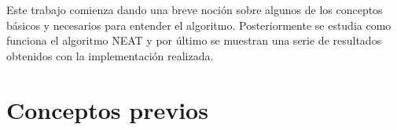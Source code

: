 \documentclass{article}
\begin{document}
Este trabajo comienza dando una breve noción sobre algunos de los conceptos básicos y necesarios para entender el algoritmo. Posteriormente se estudia como funciona el algoritmo NEAT y por último se muestran una serie de resultados obtenidos con la implementación realizada.\\

\section{Conceptos previos}
\end{document}
